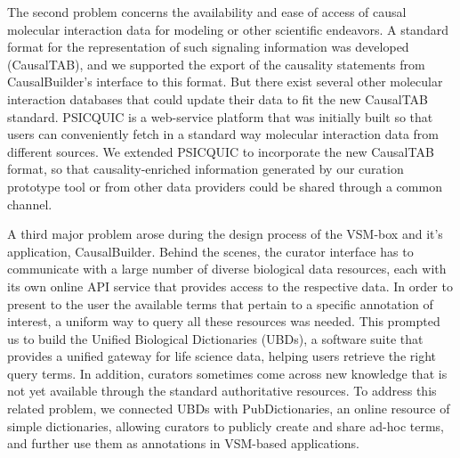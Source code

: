 \documentclass[
  12pt,
]{book}
\begin{document}
\newpage

The second problem concerns the availability and ease of access of causal molecular interaction data for modeling or other scientific endeavors.
A standard format for the representation of such signaling information was developed (CausalTAB), and we supported the export of the causality statements from CausalBuilder's interface to this format.
But there exist several other molecular interaction databases that could update their data to fit the new CausalTAB standard.
PSICQUIC is a web-service platform that was initially built so that users can conveniently fetch in a standard way molecular interaction data from different sources.
We extended PSICQUIC to incorporate the new CausalTAB format, so that causality-enriched information generated by our curation prototype tool or from other data providers could be shared through a common channel.

A third major problem arose during the design process of the VSM-box and it's application, CausalBuilder.
Behind the scenes, the curator interface has to communicate with a large number of diverse biological data resources, each with its own online API service that provides access to the respective data.
In order to present to the user the available terms that pertain to a specific annotation of interest, a uniform way to query all these resources was needed.
This prompted us to build the Unified Biological Dictionaries (UBDs), a software suite that provides a unified gateway for life science data, helping users retrieve the right query terms.
In addition, curators sometimes come across new knowledge that is not yet available through the standard authoritative resources.
To address this related problem, we connected UBDs with PubDictionaries, an online resource of simple dictionaries, allowing curators to publicly create and share ad-hoc terms, and further use them as annotations in VSM-based applications.
\end{document}
